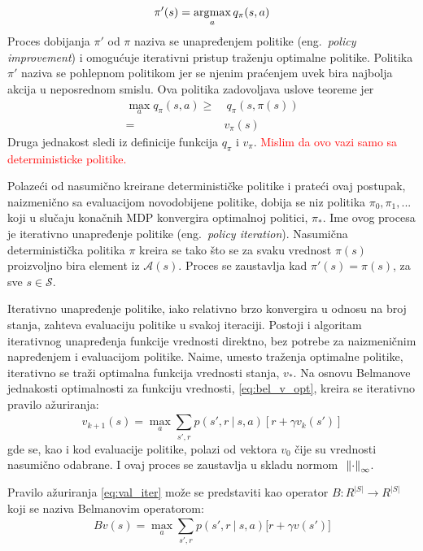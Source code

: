 \begin{equation}
	\pi'(s) = \operatorname*{\arg\!\max}_a q_{\pi}(s, a)
\end{equation}
Proces dobijanja $\pi'$ od $\pi$  naziva se unapređenjem politike (eng.~{\em policy improvement}) i omogućuje iterativni pristup traženju optimalne politike. Politika $\pi'$ naziva se pohlepnom politikom jer se njenim praćenjem uvek bira najbolja akcija u neposrednom smislu. Ova politika zadovoljava uslove teoreme jer
\begin{align}
	\max_a q_{\pi}(s,a) \geq&~ q_{\pi}(s,\pi(s)) \\=& v_{\pi}(s)
\end{align}
Druga jednakost sledi iz definicije funkcija $q_{\pi}$ i $v_{\pi}$. \textcolor{red}{Mislim da ovo vazi samo sa deterministicke politike.}
\par 
Polazeći od nasumično kreirane determinističke politike i prateći ovaj postupak, naizmenično sa evaluacijom novodobijene politike, dobija se niz politika $\pi_0, \pi_1, ...$ koji u slučaju konačnih MDP konvergira optimalnoj politici, $\pi_*$. Ime ovog procesa je iterativno unapređenje politike (eng.~{\em policy iteration}). Nasumična deterministička politika $\pi$ kreira se tako što se za svaku vrednost $\pi(s)$ proizvoljno bira element iz $\mathcal{A}(s)$. Proces se zaustavlja kad $\pi'(s) = \pi(s)$, za sve $s \in \mathcal{S}$.
\par 
Iterativno unapređenje politike, iako relativno brzo konvergira u odnosu na broj stanja, zahteva evaluaciju politike u svakoj iteraciji. Postoji i algoritam iterativnog unapređenja funkcije vrednosti direktno, bez potrebe za naizmeničnim napređenjem i evaluacijom politike. Naime, umesto traženja optimalne politike, iterativno se traži optimalna funkcija vrednosti stanja, $v_*$. Na osnovu Belmanove jednakosti optimalnosti za funkciju vrednosti, \eqref{eq:bel_v_opt}, kreira se iterativno pravilo ažuriranja:
\begin{equation}
	\label{eq:val_iter} v_{k+1}(s) = \max_{a}\sum_{s', r}^{} p(s', r~|~s,a)[r+\gamma v_k(s')]
\end{equation}
gde se, kao i kod evaluacije politike, polazi od vektora $v_0$ čije su vrednosti nasumično odabrane. I ovaj proces se zaustavlja u skladu normom ~$\norm{\cdot}_{\infty}$.
\par 
Pravilo ažuriranja \eqref{eq:val_iter} može se predstaviti kao operator $B:R^{|S|} \rightarrow R^{|S|}$ koji se naziva Belmanovim operatorom:
\begin{equation}
	Bv(s) = \max_{a}\sum_{s', r}^{} p(s', r~|~s,a)\big[r + \gamma v(s')\big]
\end{equation}
